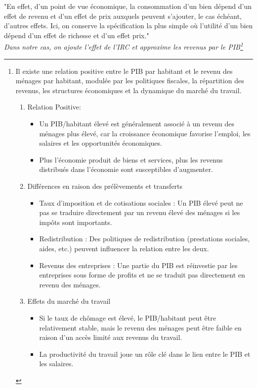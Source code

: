 "En effet, d’un point de vue économique, la consommation d’un bien dépend d’un effet de revenu et d’un effet de prix auxquels peuvent s’ajouter, le cas échéant, d’autres effets. Ici, on conserve la spécification la plus
simple où l’utilité d’un bien dépend d’un effet de richesse et d’un effet prix." \\

\textit{Dans notre cas, on ajoute l'effet de l'IRC et approxime les revenus par le PIB\footnote{Il existe une relation positive entre le PIB par habitant et le revenu des ménages par habitant, modulée par les politiques fiscales, la répartition des revenus, les structures économiques et la dynamique du marché du travail.
\begin{enumerate}
    \item Relation Positive:
    \begin{itemize}
        \item Un PIB/habitant élevé est généralement associé à un revenu des ménages plus élevé, car la croissance économique favorise l’emploi, les salaires et les opportunités économiques.
        \item Plus l’économie produit de biens et services, plus les revenus distribués dans l’économie sont susceptibles d’augmenter.
    \end{itemize}
    \item Différences en raison des prélèvements et transferts
    \begin{itemize}
        \item Taux d’imposition et de cotisations sociales : Un PIB élevé peut ne pas se traduire directement par un revenu élevé des ménages si les impôts sont importants.
        \item Redistribution : Des politiques de redistribution (prestations sociales, aides, etc.) peuvent influencer la relation entre les deux.
        \item Revenus des entreprises : Une partie du PIB est réinvestie par les entreprises sous forme de profits et ne se traduit pas directement en revenu des ménages.
    \end{itemize}
    \item Effets du marché du travail
    \begin{itemize}
        \item Si le taux de chômage est élevé, le PIB/habitant peut être relativement stable, mais le revenu des ménages peut être faible en raison d’un accès limité aux revenus du travail.
        \item La productivité du travail joue un rôle clé dans le lien entre le PIB et les salaires.

\end{itemize}
\end{enumerate}}}
